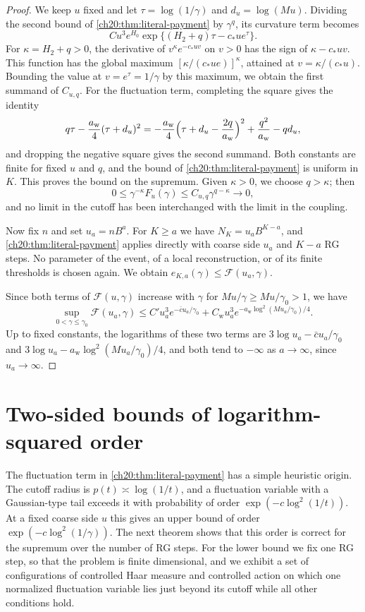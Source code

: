 \begin{proof}
We keep $u$ fixed and let $\tau=\log(1/\gamma)$ and $d_u=\log(Mu)$. Dividing the second bound of \cref{ch20:thm:literal-payment} by $\gamma^q$, its curvature term becomes
\[
 Cu^3e^{H_0}\exp\{(H_2+q)\tau-c_*ue^\tau\}.
\]
For $\kappa=H_2+q>0$, the derivative of $v^\kappa e^{-c_*uv}$ on $v>0$ has the sign of $\kappa-c_*uv$. This function has the global maximum $[\kappa/(c_*ue)]^\kappa$, attained at $v=\kappa/(c_*u)$. Bounding the value at $v=e^\tau=1/\gamma$ by this maximum, we obtain the first summand of $C_{u,q}$. For the fluctuation term, completing the square gives the identity
\[
 q\tau-\frac{a_{\mathrm w}}4(\tau+d_u)^2=-\frac{a_{\mathrm w}}4\Bigl(\tau+d_u-\frac{2q}{a_{\mathrm w}}\Bigr)^2+\frac{q^2}{a_{\mathrm w}}-qd_u,
\]
and dropping the negative square gives the second summand. Both constants are finite for fixed $u$ and $q$, and the bound of \cref{ch20:thm:literal-payment} is uniform in $K$. This proves the bound on the supremum. Given $\kappa>0$, we choose $q>\kappa$; then
\[
 0\le\gamma^{-\kappa}F_u(\gamma)\le C_{u,q}\gamma^{q-\kappa}\longrightarrow0,
\]
and no limit in the cutoff has been interchanged with the limit in the coupling.

Now fix $n$ and set $u_a=nB^a$. For $K\ge a$ we have $N_K=u_aB^{K-a}$, and \cref{ch20:thm:literal-payment} applies directly with coarse side $u_a$ and $K-a$ RG steps. No parameter of the event, of a local reconstruction, or of its finite thresholds is chosen again. We obtain $e_{K,a}(\gamma)\le\mathcal F(u_a,\gamma)$.

Since both terms of $\mathcal F(u,\gamma)$ increase with $\gamma$ for $Mu/\gamma\ge Mu/\gamma_0>1$, we have
\[
 \sup_{0<\gamma\le\gamma_0}\mathcal F(u_a,\gamma)\le C'u_a^3e^{-\bar cu_a/\gamma_0}+C_{\mathrm w}u_a^3e^{-a_{\mathrm w}\log^2(Mu_a/\gamma_0)/4}.
\]
Up to fixed constants, the logarithms of these two terms are $3\log u_a-\bar cu_a/\gamma_0$ and $3\log u_a-a_{\mathrm w}\log^2(Mu_a/\gamma_0)/4$, and both tend to $-\infty$ as $a\to\infty$, since $u_a\to\infty$.
\end{proof}

\section{Two-sided bounds of logarithm-squared order}\label{ch20:sec:log-squared}

The fluctuation term in \cref{ch20:thm:literal-payment} has a simple heuristic origin. The cutoff radius is $p(t)\asymp\log(1/t)$, and a fluctuation variable with a Gaussian-type tail exceeds it with probability of order $\exp(-c\log^2(1/t))$. At a fixed coarse side $u$ this gives an upper bound of order $\exp(-c\log^2(1/\gamma))$. The next theorem shows that this order is correct for the supremum over the number of RG steps. For the lower bound we fix one RG step, so that the problem is finite dimensional, and we exhibit a set of configurations of controlled Haar measure and controlled action on which one normalized fluctuation variable lies just beyond its cutoff while all other conditions hold.

